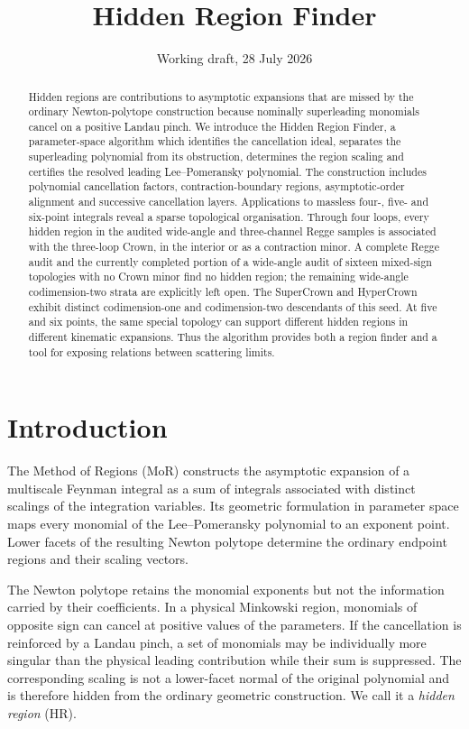 \documentclass[a4paper,11pt]{article}
\title{\bfseries Hidden Region Finder}
\author{}
\date{Working draft, 28 July 2026}
\begin{document}
\maketitle

\begin{abstract}
Hidden regions are contributions to asymptotic expansions that are missed by
the ordinary Newton-polytope construction because nominally superleading
monomials cancel on a positive Landau pinch.  We introduce the Hidden Region
Finder, a parameter-space algorithm which identifies the cancellation ideal,
separates the superleading polynomial from its obstruction, determines the
region scaling and certifies the resolved leading Lee--Pomeransky polynomial.
The construction includes polynomial cancellation factors,
contraction-boundary regions, asymptotic-order alignment and successive
cancellation layers.  Applications to massless four-, five- and six-point
integrals reveal a sparse topological organisation.  Through four loops,
every hidden region in the audited wide-angle and three-channel Regge samples
is associated with the three-loop Crown, in the interior or as a contraction
minor.  A complete Regge audit and the currently completed portion of a
wide-angle audit of sixteen mixed-sign topologies with no Crown minor find no
hidden region; the remaining wide-angle codimension-two strata are explicitly
left open.  The
SuperCrown and HyperCrown exhibit distinct codimension-one and
codimension-two descendants of this seed.  At five and six points, the same
special topology can support different hidden regions in different kinematic
expansions.  Thus the algorithm provides both a region finder and a tool for
exposing relations between scattering limits.
\end{abstract}

\tableofcontents

\section{Introduction}

The Method of Regions (MoR) constructs the asymptotic expansion of a
multiscale Feynman integral as a sum of integrals associated with distinct
scalings of the integration variables.  Its geometric formulation in
parameter space maps every monomial of the Lee--Pomeransky polynomial to an
exponent point.  Lower facets of the resulting Newton polytope determine the
ordinary endpoint regions and their scaling vectors.

The Newton polytope retains the monomial exponents but not the information
carried by their coefficients.  In a physical Minkowski region, monomials of
opposite sign can cancel at positive values of the parameters.  If the
cancellation is reinforced by a Landau pinch, a set of monomials may be
individually more singular than the physical leading contribution while
their sum is suppressed.  The corresponding scaling is not a lower-facet
normal of the original polynomial and is therefore hidden from the ordinary
geometric construction.  We call it a \emph{hidden region} (HR).
\end{document}
